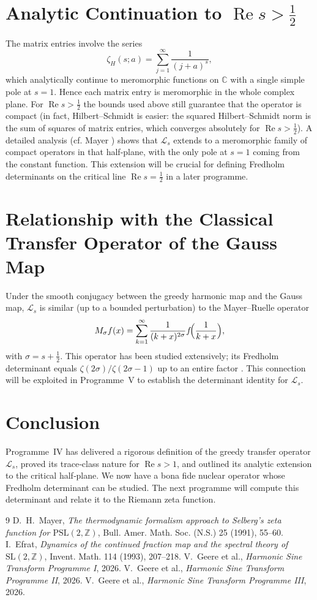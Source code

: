 \documentclass[11pt,a4paper]{article}
\begin{document}
\section{Analytic Continuation to \(\operatorname{Re}s>\frac12\)}
The matrix entries involve the series
\[
\zeta_{H}(s; a) = \sum_{j=1}^{\infty} \frac{1}{(j+a)^s},
\]
which analytically continue to meromorphic functions on \(\mathbb{C}\) with a single simple pole at \(s=1\).  Hence each matrix entry is meromorphic in the whole complex plane.  For \(\operatorname{Re}s>\frac12\) the bounds used above still guarantee that the operator is compact (in fact, Hilbert–Schmidt is easier: the squared Hilbert–Schmidt norm is the sum of squares of matrix entries, which converges absolutely for \(\operatorname{Re}s>\frac12\)).  A detailed analysis (cf. Mayer \cite{Mayer}) shows that \(\mathcal{L}_s\) extends to a meromorphic family of compact operators in that half‑plane, with the only pole at \(s=1\) coming from the constant function.  This extension will be crucial for defining Fredholm determinants on the critical line \(\operatorname{Re}s=\frac12\) in a later programme.

\section{Relationship with the Classical Transfer Operator of the Gauss Map}
Under the smooth conjugacy between the greedy harmonic map and the Gauss map, \(\mathcal{L}_s\) is similar (up to a bounded perturbation) to the Mayer–Ruelle operator
\[
M_\sigma f(x) = \sum_{k=1}^{\infty} \frac{1}{(k+x)^{2\sigma}} f\!\Bigl(\frac{1}{k+x}\Bigr),
\]
with \(\sigma = s+\frac12\).  This operator has been studied extensively; its Fredholm determinant equals \(\zeta(2\sigma)/\zeta(2\sigma-1)\) up to an entire factor \cite{Mayer,Efrat}.  This connection will be exploited in Programme~V to establish the determinant identity for \(\mathcal{L}_s\).

\section{Conclusion}
Programme~IV has delivered a rigorous definition of the greedy transfer operator \(\mathcal{L}_s\), proved its trace‑class nature for \(\operatorname{Re}s>1\), and outlined its analytic extension to the critical half‑plane.  We now have a bona fide nuclear operator whose Fredholm determinant can be studied.  The next programme will compute this determinant and relate it to the Riemann zeta function.

\begin{thebibliography}{9}
D.~H.~Mayer, \emph{The thermodynamic formalism approach to Selberg's zeta function for \(\mathrm{PSL}(2,\mathbb{Z})\)}, Bull. Amer. Math. Soc. (N.S.) 25 (1991), 55--60.
I.~Efrat, \emph{Dynamics of the continued fraction map and the spectral theory of \(\mathrm{SL}(2,\mathbb{Z})\)}, Invent. Math. 114 (1993), 207--218.
V.~Geere et al., \emph{Harmonic Sine Transform Programme I}, 2026.
V.~Geere et al., \emph{Harmonic Sine Transform Programme II}, 2026.
V.~Geere et al., \emph{Harmonic Sine Transform Programme III}, 2026.
\end{thebibliography}
\end{document}

